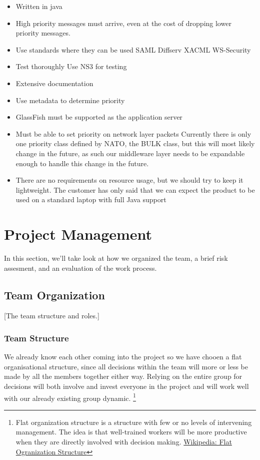 \documentclass[12pt]{article}
\begin{document}
    \begin{itemize}
        \item Written in java
        \item High priority messages must arrive, even at the cost of dropping lower priority messages.
        \item Use standards where they can be used
            \subitem SAML
            \subitem Diffserv
            \subitem XACML
            \subitem WS-Security
        \item Test thoroughly
            \subitem Use NS3 for testing
        \item Extensive documentation
        \item Use metadata to determine priority
        \item GlassFish must be supported as the application server
        \item Must be able to set priority on network layer packets
            \subitem Currently there is only one priority class defined by NATO, the BULK class, but this will most likely change in the future, as such our middleware layer needs to be expandable enough to handle this change in the future.
        \item There are no requirements on resource usage, but we should try to keep it lightweight.
            \subitem The customer has only said that we can expect the product to be used on a standard laptop with full Java support
    \end{itemize}
    
\section{Project Management}\label{management} 
    In this section, we'll take look at how we organized the team, a brief risk assesment, and an evaluation of the work process. 
    
    \subsection{Team Organization}\label{team} 
        [The team structure and roles.]
    
    \subsubsection{Team Structure}
    We already know each other coming into the project so we have chooen a flat organisational structure, since all decisions within the team will more or less be made by all the members together either way. Relying on the entire group for decisions will both involve and invest everyone in the project and will work well with our already existing group dynamic.
    \footnote{ 
        Flat organization structure is a structure with few or no levels of intervening management. The idea is that well-trained workers will be more productive when they are directly involved with decision making. 
        \href{http://en.wikipedia.org/wiki/Flat_organization}{Wikipedia: Flat Ogranization Structure} 
    }
    
\end{document}
